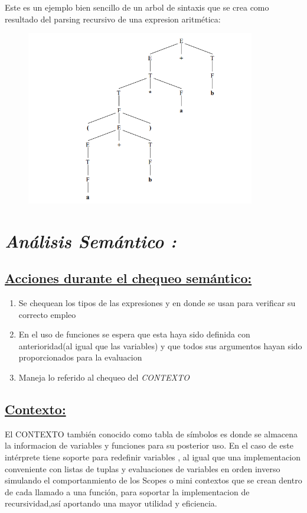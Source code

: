 \documentclass{article}%
\begin{document}
Este es un ejemplo bien sencillo de un arbol de sintaxis que se crea como resultado del parsing recursivo de una expresion aritmética:
\begin{figure}[h]
    \begin{center}
        \includegraphics*[width=10cm]{Exp aritmeticas AST.png}
    \end{center}
\end{figure}

\section{\emph{Análisis Semántico :}}

\subsection{\underline{Acciones durante el chequeo semántico:}}
\begin{enumerate}
    \item Se chequean los tipos de las expresiones y en donde se usan para verificar su correcto empleo
    \item En el uso de funciones se espera que esta haya sido definida con anterioridad(al igual que las variables) y que todos sus argumentos hayan sido proporcionados para la evaluacion
    \item Maneja lo referido al chequeo del \emph{CONTEXTO}
\end{enumerate}
\subsection{\underline{Contexto:}}
El CONTEXTO también conocido como tabla de símbolos es donde se almacena la informacion de variables y funciones para su posterior uso.
En el caso de este intérprete tiene soporte para redefinir variables , al igual que una implementacion conveniente con listas de tuplas y evaluaciones de variables en orden inverso simulando el comportanmiento de los Scopes o mini contextos que se crean dentro de cada llamado a una función, para soportar la implementacion de  recursividad,así
aportando una mayor utilidad y eficiencia.
\end{document}
